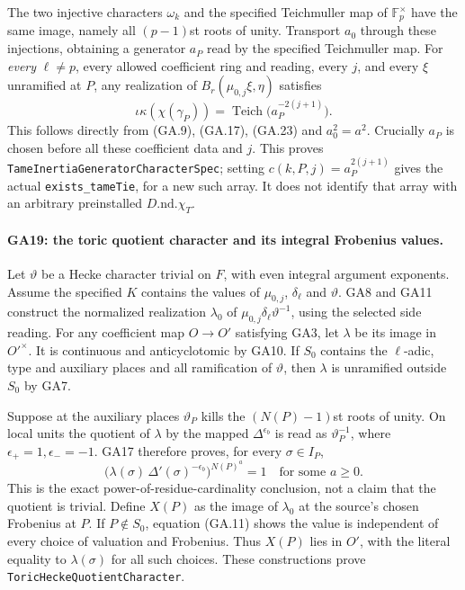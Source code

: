 The two injective characters $\omega_k$ and the specified
Teichmuller map of $\mathbb F_p^\times$ have the same
image, namely all $(p-1)$st roots of unity. Transport
$a_0$ through these injections, obtaining a generator
$a_P$ read by the specified Teichmuller map. For
\emph{every} $\ell\ne p$, every allowed coefficient ring
and reading, every $j$, and every $\xi$ unramified at $P$,
any realization of $B_r(\mu_{0,j}\xi,\eta)$ satisfies
\[
 \iota\kappa(\chi(\gamma_P))
   =\operatorname{Teich}\bigl(a_P^{-2(j+1)}\bigr).        \tag{GA.24}
\]
This follows directly from (GA.9), (GA.17), (GA.23)
and $a_0^2=a^2$. Crucially $a_P$ is chosen before all
these coefficient data and $j$. This proves
\texttt{TameInertiaGeneratorCharacterSpec}; setting
$c(k,P,j)=a_P^{2(j+1)}$ gives the actual
\texttt{exists\_tameTie}, for a new such array.
It does not identify that array with an arbitrary
preinstalled $D.\mathrm{nd}.\chi_T$.

\paragraph{GA19: the toric quotient character and its integral Frobenius values.}
Let $\vartheta$ be a Hecke character trivial on $F$,
with even integral argument exponents. Assume the
specified $K$ contains the values of $\mu_{0,j}$,
$\delta_\ell$ and $\vartheta$.
GA8 and GA11 construct the normalized realization
$\lambda_0$ of
$\mu_{0,j}\delta_\ell\vartheta^{-1}$, using the selected
side reading. For any coefficient map $O\to O'$ satisfying
GA3, let $\lambda$ be its image in $O'^\times$.
It is continuous and anticyclotomic by GA10.
If $S_0$ contains the $\ell$-adic, type and auxiliary
places and all ramification of $\vartheta$, then
$\lambda$ is unramified outside $S_0$ by GA7.

Suppose at the auxiliary places $\vartheta_P$ kills
the $(N(P)-1)$st roots of unity. On local units the
quotient of $\lambda$ by the mapped
$\Delta^{\epsilon_b}$ is read as $\vartheta_P^{-1}$,
where $\epsilon_+=1,\epsilon_-=-1$.
GA17 therefore proves, for every $\sigma\in I_P$,
\[
 \bigl(\lambda(\sigma)\,
          \Delta'(\sigma)^{-\epsilon_b}\bigr)^{N(P)^a}
        =1\quad\text{for some }a\geq0.                 \tag{GA.25}
\]
This is the exact power-of-residue-cardinality conclusion,
not a claim that the quotient is trivial.
Define $X(P)$ as the image of $\lambda_0$ at the source's
chosen Frobenius at $P$. If $P\notin S_0$, equation
(GA.11) shows the value is independent of every choice
of valuation and Frobenius. Thus $X(P)$ lies in $O'$,
with the literal equality to $\lambda(\sigma)$ for
all such choices. These constructions prove
\texttt{ToricHeckeQuotientCharacter}.

